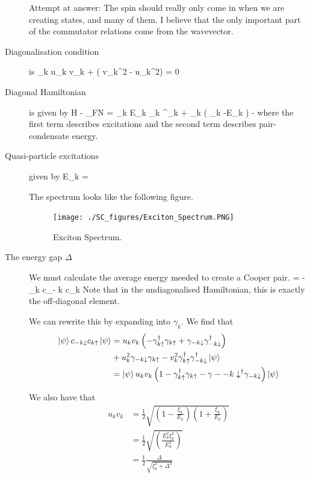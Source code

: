 \begin{description}
Attempt at answer: The spin should really only come in when we are creating states, and many of them. I believe that the only important part of the commutator relations come from the wavevector. 

\item[Diagonalisation condition] is
 \xi_k u_k v_k + \Delta ( v_k^2 - u_k^2) = 0
\eeq


\item[Diagonal Hamiltonian] is given by 
\beq
H - \epsilon_FN = \sum_{k \sigma} E_k \gamma_{k \sigma}^\dagger \gamma_{k \sigma} + \sum_k ( \xi_k  -E_k ) -  \Omega
\eeq
where the first term describes excitations and the second term describes pair-condensate energy. 

\item[Quasi-particle excitations] given by 
\beq
E_k = 
\eeq

The spectrum looks like the following figure. 



\begin{figure}[h]
  \caption{Exciton Spectrum.}
  \centering
    \texttt{[image: ./SC\_figures/Exciton\_Spectrum.PNG]}
\end{figure}


\item[The energy gap $\Delta$]  We must calculate the average energy meeded to create a Cooper pair. 
\beq
\Delta = -  \sum_k \bra{\psi} c_{- k \downarrow} c_{k \uparrow} \ket{\psi}
\eeq
Note that in the undiagonalised Hamiltonian, this is exactly the off-diagonal element. 

We can rewrite this by expanding into $\gamma_k$. We find that 
\begin{align}
\left| \psi \right\rangle c_{-k \downarrow} c_{k \uparrow} \left| \psi \right\rangle &= u_k v_k \left( - \gamma_{k \uparrow}^\dagger \gamma_{k \uparrow} + \gamma_{-k \downarrow} \gamma_{- k \downarrow}^\dagger\right) \\
&+ u_k^2 \gamma_{- k \downarrow} \gamma_{k \uparrow} - v_k^2 \gamma_{k \uparrow}^\dagger \gamma_{- k \downarrow}^\dagger \left| \psi \right\rangle \\
&= \left| \psi \right\rangle u_k v_k \left( 1 - \gamma_{k \uparrow}^\dagger \gamma_{k \uparrow} - \gamma-{- k \downarrow}^\dagger \gamma_{- k \downarrow}\right) \left| \psi \right\rangle
\end{align}

We also have that
\begin{align}
u_k v_k &= \frac{1}{2} \sqrt{\left( 1 - \frac{\xi_k}{E_k} \right)\left( 1 + \frac{\xi_k}{E_k} \right) } \\
&= \frac{1}{2} \sqrt{ \left( \frac{E^2_k \xi_k^2}{E_k^2} \right) } \\
&= \frac{1}{2} \frac{\Delta}{\sqrt{\xi_k^2 + \Delta^2}}
\end{align}


\end{description}
